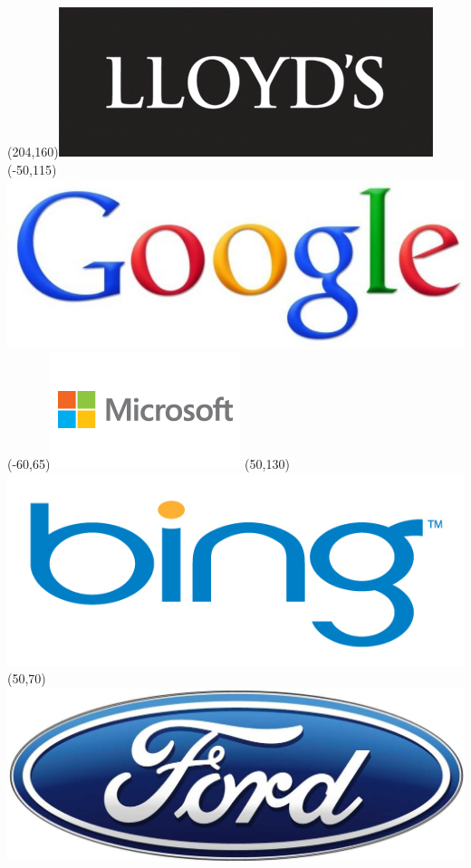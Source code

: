 \begin{frame}
\Put(204,160){\includegraphics[scale=.16]{../common/pics/R_using_logos/lloyds}}
\Put(-50,115){\includegraphics[scale=.12]{../common/pics/R_using_logos/google}}
\Put(-60,65){\includegraphics[scale=.50]{../common/pics/R_using_logos/rcon_logo_microsoft.png}}
\Put(50,130){\includegraphics[scale=.12]{../common/pics/R_using_logos/bing}}
\Put(50,70){\includegraphics[scale=.29]{../common/pics/R_using_logos/ford}}

\end{frame}
